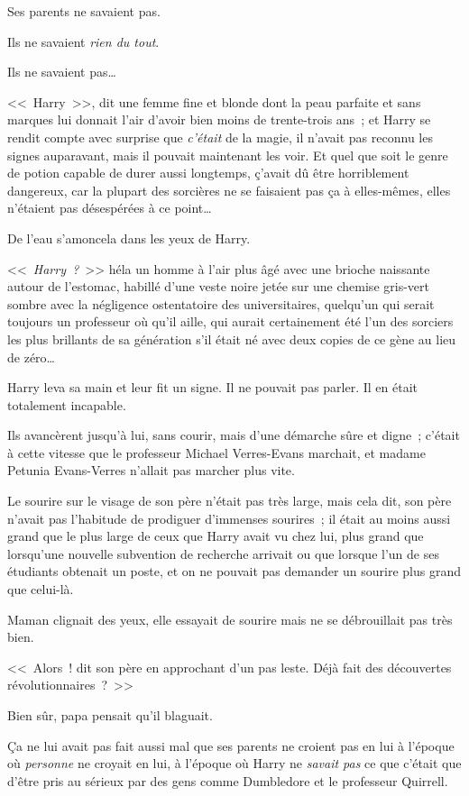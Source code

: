 Ses parents ne savaient pas.

Ils ne savaient \emph{rien du tout}.

Ils ne savaient pas…

<<~Harry~>>, dit une femme fine et blonde dont la peau parfaite et sans marques lui donnait l'air d'avoir bien moins de trente-trois ans~; et Harry se rendit compte avec surprise que \emph{c'était} de la magie, il n'avait pas reconnu les signes auparavant, mais il pouvait maintenant les voir. Et quel que soit le genre de potion capable de durer aussi longtemps, ç'avait dû être horriblement dangereux, car la plupart des sorcières ne se faisaient pas ça à elles-mêmes, elles n'étaient pas désespérées à ce point…

De l'eau s'amoncela dans les yeux de Harry.

<<~\emph{Harry~?}~>> héla un homme à l'air plus âgé avec une brioche naissante autour de l'estomac, habillé d'une veste noire jetée sur une chemise gris-vert sombre avec la négligence ostentatoire des universitaires, quelqu'un qui serait toujours un professeur où qu'il aille, qui aurait certainement été l'un des sorciers les plus brillants de sa génération s'il était né avec deux copies de ce gène au lieu de zéro…

Harry leva sa main et leur fit un signe. Il ne pouvait pas parler. Il en était totalement incapable.

Ils avancèrent jusqu'à lui, sans courir, mais d'une démarche sûre et digne~; c'était à cette vitesse que le professeur Michael Verres-Evans marchait, et madame Petunia Evans-Verres n'allait pas marcher plus vite.

Le sourire sur le visage de son père n'était pas très large, mais cela dit, son père n'avait pas l'habitude de prodiguer d'immenses sourires~; il était au moins aussi grand que le plus large de ceux que Harry avait vu chez lui, plus grand que lorsqu'une nouvelle subvention de recherche arrivait ou que lorsque l'un de ses étudiants obtenait un poste, et on ne pouvait pas demander un sourire plus grand que celui-là.

Maman clignait des yeux, elle essayait de sourire mais ne se débrouillait pas très bien.

<<~Alors~! dit son père en approchant d'un pas leste. Déjà fait des découvertes révolutionnaires~?~>>

Bien sûr, papa pensait qu'il blaguait.

Ça ne lui avait pas fait aussi mal que ses parents ne croient pas en lui à l'époque où \emph{personne} ne croyait en lui, à l'époque où Harry ne \emph{savait pas} ce que c'était que d'être pris au sérieux par des gens comme Dumbledore et le professeur Quirrell.

